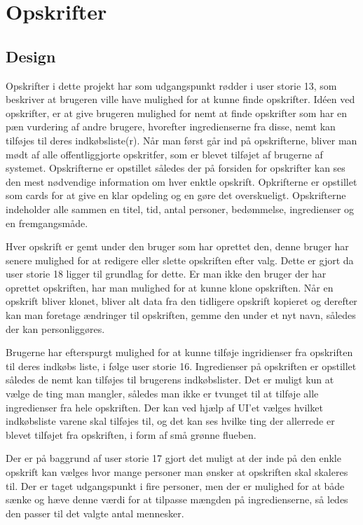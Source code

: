 \section{Opskrifter}
\subsection{Design}
Opskrifter i dette projekt har som udgangspunkt rødder i user storie 13, som beskriver at brugeren ville have mulighed for at kunne finde opskrifter.
Idéen ved opskrifter, er at give brugeren mulighed for nemt at finde opskrifter som har en pæn vurdering af andre brugere, hvorefter ingredienserne fra disse, nemt kan tilføjes til deres indkøbsliste(r).
Når man først går ind på opskrifterne, bliver man mødt af alle offentliggjorte opskritfer, som er blevet tilføjet af brugerne af systemet.
Opskrifterne er opstillet således der på forsiden for opskrifter kan ses den mest nødvendige information om hver enktle opskrift.
Opkrifterne er opstillet som cards for at give en klar opdeling og en gøre det overskueligt.
Opskrifterne indeholder alle sammen en titel, tid, antal personer, bedømmelse, ingredienser og en fremgangsmåde.


Hver opskrift er gemt under den bruger som har oprettet den, denne bruger har senere mulighed for at redigere eller slette opskriften efter valg.
Dette er gjort da user storie 18 ligger til grundlag for dette.
Er man ikke den bruger der har oprettet opskriften, har man mulighed for at kunne klone opskriften.
Når en opskrift bliver klonet, bliver alt data fra den tidligere opskrift kopieret og derefter kan man foretage ændringer til opskriften, gemme den under et nyt navn, således der kan personliggøres.


Brugerne har efterspurgt mulighed for at kunne tilføje ingridienser fra opskriften til deres indkøbs liste, i følge user storie 16.
Ingredienser på opskriften er opstillet således de nemt kan tilføjes til brugerens indkøbslister.
Det er muligt kun at vælge de ting man mangler, således man ikke er tvunget til at tilføje alle ingredienser fra hele opskriften.
Der kan ved hjælp af UI'et vælges hvilket indkøbsliste varene skal tilføjes til, og det kan ses hvilke ting der allerrede er blevet tilføjet fra opskriften, i form af små grønne flueben.


Der er på baggrund af user storie 17 gjort det muligt at der inde på den enkle opskrift kan vælges hvor mange personer man ønsker at opskriften skal skaleres til.
Der er taget udgangspunkt i fire personer, men der er mulighed for at både sænke og hæve denne værdi for at tilpasse mængden på ingredienserne, så ledes den passer til det valgte antal mennesker.


